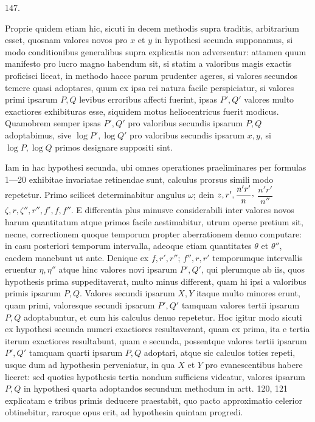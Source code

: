 \par{}\medskip
\begin{center}\hypertarget{native-197-article147}{}147.\end{center}
Proprie quidem etiam hic, sicuti in decem methodis supra traditis, arbitrarium
esset, quosnam valores novos pro $x$ et $y$ in hypothesi secunda supponamus,
si modo conditionibus generalibus supra explicatis non adversentur:
attamen quum manifesto pro lucro magno habendum sit, si statim a valoribus
magis exactis proficisci liceat, in methodo hacce parum prudenter ageres, si
valores secundos temere quasi adoptares, quum ex ipsa rei natura facile perspiciatur,
si valores primi ipsarum $P,Q$ levibus erroribus affecti fuerint, ipsas
$P',Q'$ valores multo exactiores exhibituras esse, siquidem motus heliocentricus
fuerit modicus. Quamobrem semper ipsas $P',Q'$ pro valoribus secundis
ipsarum $P,Q$ adoptabimus, sive $\log P',\log Q'$ pro valoribus secundis ipsarum
$x,y$, si $\log P,\log Q$ primos designare suppositi sint.

Iam in hac hypothesi secunda, ubi omnes operationes praeliminares per
formulas 1—20 exhibitae invariatae retinendae sunt, calculus prorsus simili modo
repetetur. Primo scilicet determinabitur angulus $\omega$; dein $z,r',\dfrac{n'r'}{n}\mathpunct{\raisebox{.45ex}{,}}$ $\dfrac{n'r'}{n''}$
$\zeta,r,\zeta'',r'',f',f,f''$. E differentia plus minusve considerabili inter valores novos
harum quantitatum atque primos facile aestimabitur, utrum operae pretium sit,
necne, correctionem quoque temporum propter aberrationem denuo computare:
in casu posteriori temporum intervalla, adeoque etiam quantitates $\theta$ et $\theta''$,
eaedem manebunt ut ante. Denique ex $f,r',r''$; $f'',r,r'$ temporumque intervallis
eruentur $\eta,\eta''$ atque hinc valores novi ipsarum $P',Q'$, qui plerumque ab iis,
quos hypothesis prima suppeditaverat, multo minus different, quam hi ipsi a
valoribus primis ipsarum $P,Q$. Valores secundi ipsarum $X,Y$ itaque multo
minores erunt, quam primi, valoresque secundi ipsarum $P',Q'$ tamquam valores
tertii ipsarum $P,Q$ adoptabuntur, et cum his calculus denuo repetetur.
Hoc igitur modo sicuti ex hypothesi secunda numeri exactiores resultaverant,
quam ex prima, ita e tertia iterum exactiores resultabunt, quam e secunda,
possentque valores tertii ipsarum $P',Q'$ tamquam quarti ipsarum $P,Q$ adoptari,
atque sic calculos toties repeti, usque dum ad hypothesin perveniatur, in qua
$X$ et $Y$ pro evanescentibus habere liceret: sed quoties hypothesis tertia nondum
sufficiens videatur, valores ipsarum $P,Q$ in hypothesi quarta adoptandos
secundum methodum in artt. 120, 121 explicatam e tribus primis deducere
praestabit, quo pacto approximatio celerior obtinebitur, raroque opus erit, ad
hypothesin quintam progredi.
